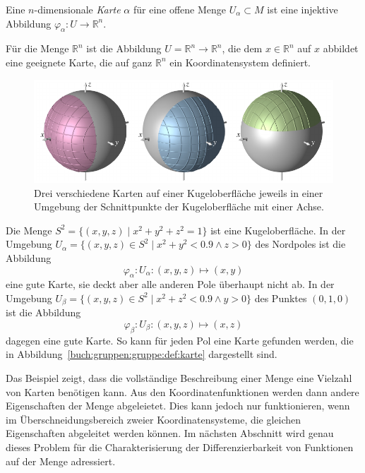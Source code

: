 \begin{definition}
\label{buch:gruppen:gruppe:def:karte}
Eine $n$-dimensionale {\em Karte} $\alpha$ für eine offene Menge
$U_\alpha\subset M$ ist eine injektive Abbildung
$\varphi_\alpha\colon U\to \mathbb{R}^n$.
\end{definition}

\begin{beispiel}
Für die Menge $\mathbb{R}^n$ ist die Abbildung
$U=\mathbb{R}^n\to \mathbb{R}^n$, die dem $x\in\mathbb{R}^n$ auf
$x$ abbildet eine geeignete Karte, die auf ganz $\mathbb{R}^n$ ein
Koordinatensystem definiert.
\end{beispiel}

\begin{beispiel}
\label{buch:gruppen:gruppe:bsp:kugel}
\begin{figure}
\centering
\includegraphics{chapters/030-gruppen/images/kugelkarten.pdf}
\caption{Drei verschiedene Karten auf einer Kugeloberfläche jeweils in
einer Umgebung der Schnittpunkte der Kugeloberfläche mit einer
Achse.
\label{buch:gruppen:gruppe:fig:kugelkarten}}
\end{figure}
Die Menge $S^2 = \{(x,y,z)\mid x^2+y^2+z^2=1\}$ ist eine Kugeloberfläche.
In der Umgebung $U_\alpha = \{(x,y,z)\in S^2\mid x^2+y^2<0.9\wedge z>0\}$
des Nordpoles ist die Abbildung
\[
\varphi_\alpha
\colon
U_\alpha
:
(x,y,z)\mapsto (x,y)
\]
eine gute Karte, sie deckt aber alle anderen Pole überhaupt nicht ab.
In der Umgebung $U_\beta = \{(x,y,z)\in S^2\mid x^2+z^2<0.9\wedge y>0\}$
des Punktes $(0,1,0)$ ist die Abbildung
\[
\varphi_\beta
\colon
U_\beta
:
(x,y,z)\mapsto (x,z)
\]
dagegen eine gute Karte.
So kann für jeden Pol eine Karte gefunden werden, die in 
Abbildung~\ref{buch:gruppen:gruppe:def:karte} dargestellt sind.
\end{beispiel}

Das Beispiel zeigt, dass die vollständige Beschreibung einer Menge
eine Vielzahl von Karten benötigen kann.
Aus den Koordinatenfunktionen werden dann andere Eigenschaften der
Menge abgeleietet.
Dies kann jedoch nur funktionieren, wenn im Überschneidungsbereich
zweier Koordinatensysteme, die gleichen Eigenschaften abgeleitet
werden können.
Im nächsten Abschnitt wird genau dieses Problem für die
Charakterisierung der Differenzierbarkeit von Funktionen auf der
Menge adressiert.

